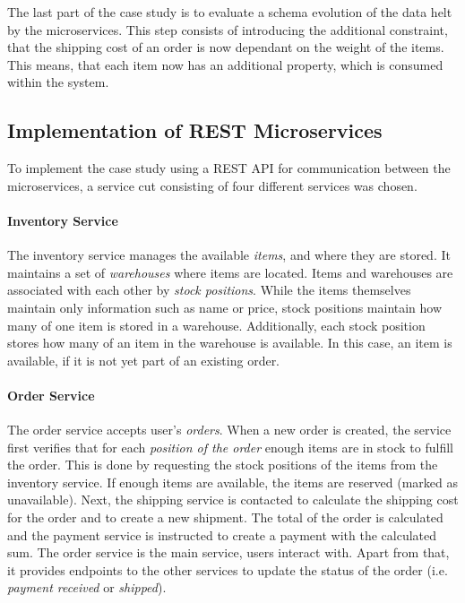 The last part of the case study is to evaluate a schema evolution of the data helt by the microservices.
This step consists of introducing the additional constraint, that the shipping cost of an order is now dependant on the weight of the items.
This means, that each item now has an additional property, which is consumed within the system.

\subsection{Implementation of \acs{REST} Microservices}

To implement the case study using a \ac{REST} \ac{API} for communication between the microservices, a service cut consisting of four different services was chosen.

\paragraph{Inventory Service}

The inventory service manages the available \textit{items}, and where they are stored.
It maintains a set of \textit{warehouses} where items are located.
Items and warehouses are associated with each other by \textit{stock positions}.
While the items themselves maintain only information such as name or price, stock positions maintain how many of one item is stored in a warehouse.
Additionally, each stock position stores how many of an item in the warehouse is available.
In this case, an item is available, if it is not yet part of an existing order.

\paragraph{Order Service}

The order service accepts user's \textit{orders}.
When a new order is created, the service first verifies that for each \textit{position of the order} enough items are in stock to fulfill the order.
This is done by requesting the stock positions of the items from the inventory service.
If enough items are available, the items are reserved (marked as unavailable).
Next, the shipping service is contacted to calculate the shipping cost for the order and to create a new shipment.
The total of the order is calculated and the payment service is instructed to create a payment with the calculated sum.
The order service is the main service, users interact with.
Apart from that, it provides endpoints to the other services to update the status of the order (i.e. \textit{payment received} or \textit{shipped}).

